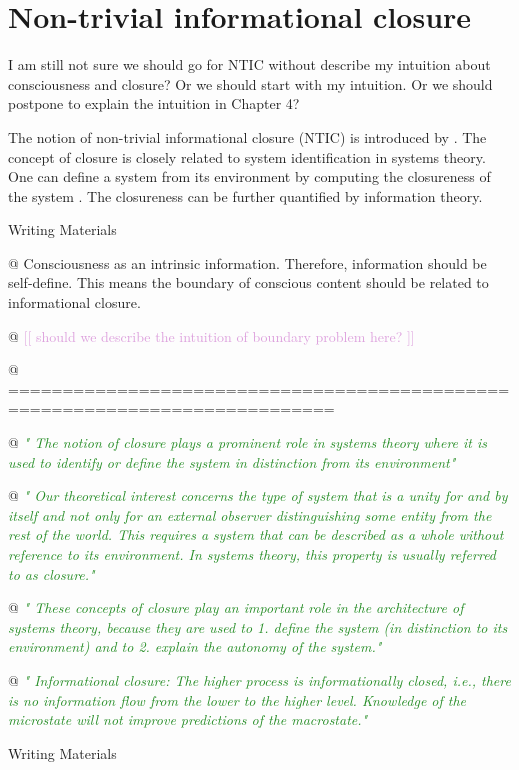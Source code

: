 \documentclass[utf8]{article}
\newenvironment{writingMaterials}
			{	
			\begin{tcolorbox}[size=small, colframe=black!20!white, toprule=1mm]
				Writing Materials
			\end{tcolorbox}
			
			\begin{easylist}[itemize]		
			}
			{
			\end{easylist}
			\begin{tcolorbox}[size=small, bottomrule=1mm, halign=flush right, colframe=black!20!white]
				Writing Materials
			\end{tcolorbox}			
			}
\newcommand{\rewrite}[1]{\textcolor{ForestGreen}{\textit{"#1"}}\newline}
\newcommand{\idea}[2][Plum]{\noindent
				\textcolor{#1}{[[ #2 ]]}}
\newcommand{\ideaBox}[1]{
				\begin{tcolorbox}[%
					width=12cm,
					sharp corners=downhill, 
					hyphenationfix, 
					arc=8pt,
					colback=Thistle!50!white, 
					flush right,
					halign=flush right,
					]%
					#1
				\end{tcolorbox}
			}
\begin{document}
	
	
	
	
	

	\section{Non-trivial informational closure}
		\ideaBox{I am still not sure we should go for NTIC without describe my intuition about consciousness and closure? Or we should start with my intuition. Or we should postpone to explain the intuition in Chapter 4?}
		
		The notion of non-trivial informational closure (NTIC) is introduced by \cite{BERTSCHINGER.2006}. The concept of closure is closely related to system identification in systems theory. One can define a system from its environment by computing the closureness of the system \citep{maturana1991autopoiesis, rosen1991life, pattee2012evolving, luhmann1995probleme}. The closureness can be further quantified by information theory. 
	
		\begin{writingMaterials}			
			@ Consciousness as an intrinsic information. Therefore, information should be self-define. This means the boundary of conscious content should be related to informational closure. 
			
			@ \idea{should we describe the intuition of boundary problem here?}
			
			@ ============================================================================
			
			
			@ \rewrite{
				The notion of closure plays a prominent role in systems theory where it is used to identify or define the system in distinction from its environment} \cite{BERTSCHINGER.2006}
	
			@ \rewrite{
				Our theoretical interest concerns the type of system that is a unity for and by itself and not only for an external observer distinguishing some entity from the rest of the world. This requires a system that can be described as a whole without reference to its environment. In systems theory, this property is usually referred to as closure.}\citep{BERTSCHINGER.2006}
			
			@ \rewrite{
				These concepts of closure play an important role in the architecture of systems
				theory, because they are used to
				1. define the system (in distinction to its environment) and to 
				2. explain the autonomy of the system.}\citep{BERTSCHINGER.2006}
			
			@ \rewrite{
				Informational closure: The higher process is informationally closed, i.e., there is no information flow from the lower to the higher level. Knowledge of the microstate will not improve predictions of the macrostate.} \citep[p. 4]{PFANTE.2014}
			
							
		\end{writingMaterials}
	
\end{document}

